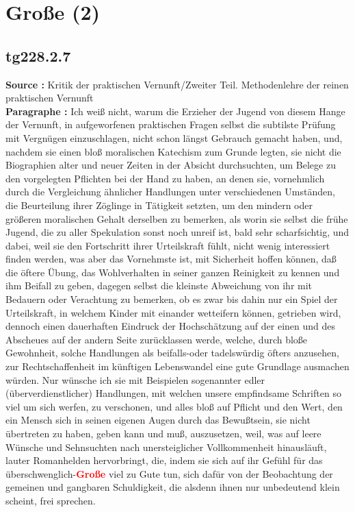 \documentclass[a4paper,12pt,twoside]{book}
\newcommand{\match}[1]{\textcolor{red}{\textbf{#1}}}
\newcommand{\unnumberedsection}[1]{
	\section*{#1}
	\addcontentsline{toc}{section}{#1}
	\markright{#1}
}
\begin{document}
	\unnumberedsection{Große (2)} 
	\subsection*{tg228.2.7} 
	\textbf{Source : }Kritik der praktischen Vernunft/Zweiter Teil. Methodenlehre der reinen praktischen Vernunft\\  
	
	\textbf{Paragraphe : }Ich weiß nicht, warum die Erzieher der Jugend von diesem Hange der Vernunft, in aufgeworfenen praktischen Fragen selbst die subtilste Prüfung mit Vergnügen einzuschlagen, nicht schon längst Gebrauch gemacht haben, und, nachdem sie einen bloß moralischen Katechism zum Grunde legten, sie nicht die Biographien alter und neuer Zeiten in  der Absicht durchsuchten, um Belege zu den vorgelegten Pflichten bei der Hand zu haben, an denen sie, vornehmlich durch die Vergleichung ähnlicher Handlungen unter verschiedenen Umständen, die Beurteilung ihrer Zöglinge in Tätigkeit setzten, um den mindern oder größeren moralischen Gehalt derselben zu bemerken, als worin sie selbst die frühe Jugend, die zu aller Spekulation sonst noch unreif ist, bald sehr scharfsichtig, und dabei, weil sie den Fortschritt ihrer Urteilskraft fühlt, nicht wenig interessiert finden werden, was aber das Vornehmste ist, mit Sicherheit hoffen können, daß die öftere Übung, das Wohlverhalten in seiner ganzen Reinigkeit zu kennen und ihm Beifall zu geben, dagegen selbst die kleinste Abweichung von ihr mit Bedauern oder Verachtung zu bemerken, ob es zwar bis dahin nur ein Spiel der Urteilskraft, in welchem Kinder mit einander wetteifern können, getrieben wird, dennoch einen dauerhaften Eindruck der Hochschätzung auf der einen und des Abscheues auf der andern Seite zurücklassen werde, welche, durch bloße Gewohnheit, solche Handlungen als beifalls-oder tadelswürdig öfters anzusehen, zur Rechtschaffenheit im künftigen Lebenswandel eine gute Grundlage ausmachen würden. Nur wünsche ich sie mit Beispielen sogenannter edler (überverdienstlicher) Handlungen, mit welchen unsere empfindsame Schriften so viel um sich werfen, zu verschonen, und alles bloß auf Pflicht und den Wert, den ein Mensch sich in seinen eigenen Augen durch das Bewußtsein, sie nicht übertreten zu haben, geben kann und muß, auszusetzen, weil, was auf leere Wünsche und Sehnsuchten nach unersteiglicher Vollkommenheit hinausläuft, lauter Romanhelden hervorbringt, die, indem sie sich auf ihr Gefühl für das überschwenglich-\match{Große} viel zu Gute tun, sich dafür von der Beobachtung der gemeinen und gangbaren Schuldigkeit, die alsdenn ihnen nur unbedeutend klein scheint, frei sprechen.
	
\end{document}
